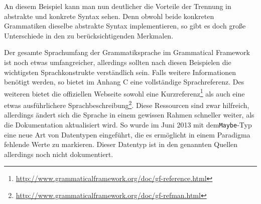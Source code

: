 An diesem Beispiel kann man nun deutlicher die Vorteile der Trennung in abstrakte und konkrete Syntax sehen. Denn obwohl beide konkreten Grammatiken dieselbe abstrakte Syntax implementieren, so gibt es doch große Unterschiede in den zu berücksichtigenden Merkmalen. \par
Der gesamte Sprachumfang der Grammatiksprache im Grammatical Framework ist noch etwas umfangreicher, allerdings sollten nach diesen Beispielen die wichtigsten Sprachkonstrukte verständlich sein. Falls weitere Informationen benötigt werden, so bietet \cite{RANTA2011} im Anhang C eine vollständige Sprachreferenz. Des weiteren bietet die offiziellen Webseite sowohl eine Kurzreferenz\footnote{\url{http://www.grammaticalframework.org/doc/gf-reference.html}} als auch eine etwas ausführlichere Sprachbeschreibung\footnote{\url{http://www.grammaticalframework.org/doc/gf-refman.html}}. Diese Ressourcen sind zwar hilfreich, allerdings ändert sich die Sprache in einem gewissen Rahmen schneller weiter, als die Dokumentation aktualisiert wird. So wurde im Juni 2013 mit dem\texttt{Maybe}-Typ eine neue Art von Datentypen eingeführt, die es ermöglicht in einem Paradigma fehlende Werte zu markieren. Dieser Datentyp ist in den genannten Quellen allerdings noch nicht dokumentiert.
\FloatBarrier
\pagebreak
